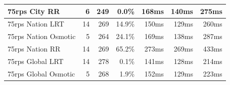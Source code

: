 \documentclass[draft,final]{vutinfth} %
\begin{document}
\begin{table}[]
\begin{tabular}{lrrrrrr}
75rps City RR        & 6                                                              & 249                                                                                       & 0.0\%                                                                         & 168ms                                                       & 140ms                                                         & 275ms                                                      \\ \hline
75rps Nation LRT     & 14                                                             & 269                                                                                       & 14.9\%                                                                        & 150ms                                                       & 129ms                                                         & 260ms                                                      \\
75rps Nation Osmotic & 5                                                              & 264                                                                                       & 24.1\%                                                                        & 169ms                                                       & 138ms                                                         & 287ms                                                      \\
75rps Nation RR      & 14                                                             & 269                                                                                       & 65.2\%                                                                        & 273ms                                                       & 269ms                                                         & 433ms                                                      \\ \hline
75rps Global LRT     & 14                                                             & 278                                                                                       & 0.1\%                                                                         & 141ms                                                       & 128ms                                                         & 214ms                                                      \\
75rps Global Osmotic & 5                                                              & 268                                                                                       & 1.9\%                                                                         & 152ms                                                       & 129ms                                                         & 223ms                                                      \\

\end{tabular}
\end{table}
\end{document}
